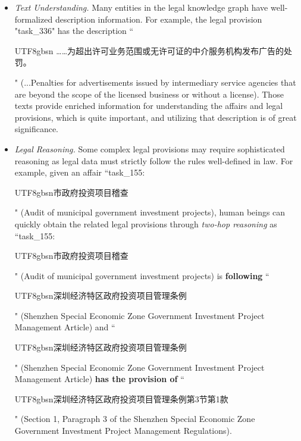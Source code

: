 \documentclass[runningheads]{llncs}
\begin{document}
\begin{itemize}
\item  \emph{Text Understanding.}  Many entities in the legal knowledge graph have well-formalized description information. For example, the legal provision  "task\_336" has the description   ``\begin{CJK}{UTF8}{gbsn} ……为超出许可业务范围或无许可证的中介服务机构发布广告的处罚。\end{CJK}" (...Penalties for advertisements issued by intermediary service agencies that are beyond the scope of the licensed business or without a license). Those texts provide enriched information for understanding the affairs and legal provisions, which is quite important, and utilizing that description is of great significance. 
    
\item  \emph{Legal Reasoning.} Some complex legal provisions may require sophisticated reasoning as legal data must strictly follow the rules well-defined in law. For example, given an affair ``task\_155: \begin{CJK}{UTF8}{gbsn}市政府投资项目稽查\end{CJK}" (Audit of municipal government investment projects), human beings can quickly obtain the related legal provisions through \emph{two-hop reasoning} as ``task\_155: \begin{CJK}{UTF8}{gbsn}市政府投资项目稽查\end{CJK}" (Audit of municipal government investment projects)  is \textbf{following} ``\begin{CJK}{UTF8}{gbsn}深圳经济特区政府投资项目管理条例\end{CJK}" (Shenzhen Special Economic Zone Government Investment Project Management Article)    and  ``\begin{CJK}{UTF8}{gbsn}深圳经济特区政府投资项目管理条例\end{CJK}" (Shenzhen Special Economic Zone Government Investment Project Management Article) \textbf{has the provision of}  ``\begin{CJK}{UTF8}{gbsn}深圳经济特区政府投资项目管理条例第3节第1款\end{CJK}" (Section 1, Paragraph 3 of the Shenzhen Special Economic Zone Government Investment Project Management Regulations). 
\end{itemize}
\end{document}
